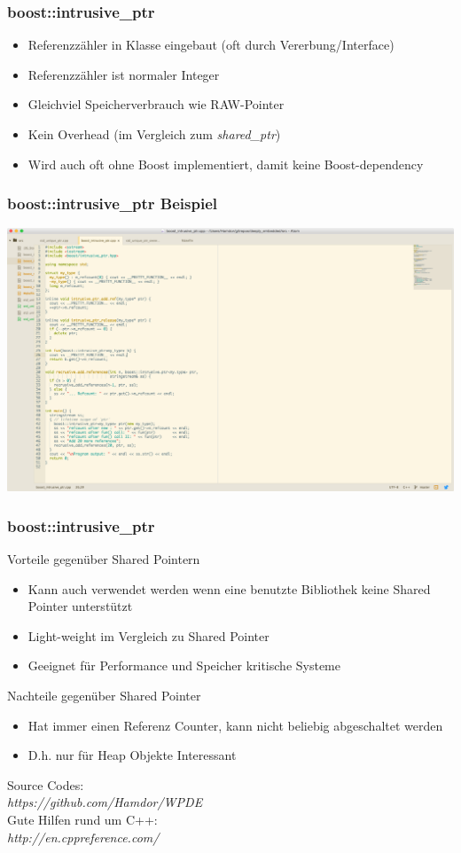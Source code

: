 \documentclass{beamer}
\begin{document}
\begin{frame}[fragile]
 \frametitle{boost::intrusive\_ptr}
 \begin{itemize}
   \item Referenzzähler in Klasse eingebaut \tiny (oft durch Vererbung/Interface)\normalsize
   \item Referenzzähler ist normaler Integer
   \item Gleichviel Speicherverbrauch wie RAW-Pointer
   \item Kein Overhead (im Vergleich zum \textit{shared\_ptr})
   \item Wird auch oft ohne Boost implementiert, damit keine Boost-dependency
 \end{itemize}
\end{frame}

\begin{frame}
 \frametitle{boost::intrusive\_ptr Beispiel}
 \includegraphics[scale=.21]{intrusive_ptr}	
\end{frame}

\begin{frame}
 \frametitle{boost::intrusive\_ptr}
 Vorteile gegenüber Shared Pointern
 \begin{itemize}
  \item Kann auch verwendet werden wenn eine benutzte Bibliothek keine Shared Pointer unterstützt
  \item Light-weight im Vergleich zu Shared Pointer
  \item Geeignet für Performance und Speicher kritische Systeme
 \end{itemize}
 Nachteile gegenüber Shared Pointer
 \begin{itemize}
 	\item Hat immer einen Referenz Counter, kann nicht beliebig abgeschaltet werden
 	\item D.h. nur für Heap Objekte Interessant
 \end{itemize}
\end{frame}

\begin{frame}
\center
Source Codes:\\
\textit{https://github.com/Hamdor/WPDE}\\
Gute Hilfen rund um C++:\\
\textit{http://en.cppreference.com/}
\end{frame}
\end{document}

